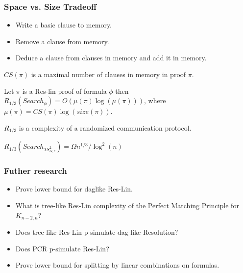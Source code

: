 \begin{frame}
    \frametitle{Space vs. Size Tradeoff}

    \pause
    \begin{itemize}
    	\item Write a basic clause to memory.
    	\item Remove a clause from memory.
    	\item Deduce a clause from clauses in memory and add it in memory.
    \end{itemize}

    \pause
    $CS(\pi)$ is a maximal number of clauses in memory in proof $\pi$.

    \pause
    \begin{theorem}
        Let $\pi$ is a Res-lin proof of formula $\phi$ then $R_{1 / 3}(Search_{\phi})
        = O(\mu(\pi) \log(\mu(\pi)))$, where $\mu(\pi) = CS(\pi) \log(size(\pi))$.
    \end{theorem}

    $R_{1 / 3}$ is a complexity of a randomized communication protocol.
    
    \pause

    $R_{1 / 3}(Search_{TS_{G,c}^2}) = \Omega{n^{1 / 3} / \log^2(n)}$
\end{frame}


\begin{frame}
    \frametitle{Futher research}

    \begin{itemize}
		\item Prove lower bound for daglike Res-Lin.
		\item What is tree-like Res-Lin complexity of the Perfect Matching Principle
		    for $K_{n - 2, n}$? 
		\item Does tree-like Res-Lin p-simulate dag-like Resolution?
		\item Does PCR p-simulate Res-Lin?
		\item Prove lower bound for splitting by linear combinations on
		     formulas.
	\end{itemize}
\end{frame}


